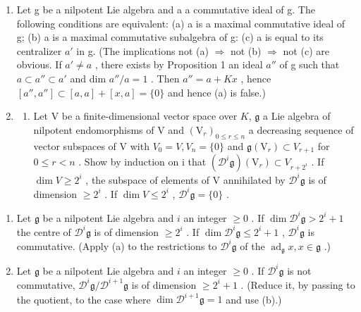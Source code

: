 \begin{enumerate}
\def\labelenumi{\arabic{enumi}.}
\setcounter{enumi}{5}
\item
  Let g be a nilpotent Lie algebra and a a commutative ideal of g. The following conditions are equivalent: (a) a is a maximal commutative ideal of g; (b) a is a maximal commutative subalgebra of g: (c) a is equal to its centralizer \(a'\) in g. (The implications not (a) \(\Rightarrow\) not (b) \(\Rightarrow\) not (c) are obvious. If \(a' \neq a\) , there exists by Proposition 1 an ideal \(a''\) of g such that \(a \subset a'' \subset a'\) and dim \(a''/a = 1\) . Then \(a'' = a + Kx\) , hence \([a'', a''] \subset [a, a] + [x, a] = \{0\}\) and hence (a) is false.)
\item
  \begin{enumerate}
  \def\labelenumii{(\alph{enumii})}
  \tightlist
  \item
    Let V be a finite-dimensional vector space over \(K\), \(\mathfrak{g}\) a Lie algebra of nilpotent endomorphisms of V and \((\mathrm{V}_{r})_{0 \leq r \leq n}\) a decreasing sequence of vector subspaces of V with \(V_{0} = V, V_{n} = \{0\}\) and \(\mathfrak{g}(\mathrm{V}_{r}) \subset V_{r+1}\) for \(0 \leq r < n\) . Show by induction on i that \((\mathcal{D}^{i}\mathfrak{g})(\mathrm{V}_{r}) \subset V_{r+2^{i}}\) . If \(\dim V \geq 2^{i}\) , the subspace of elements of V annihilated by \(\mathcal{D}^{i}\mathfrak{g}\) is of dimension \(\geqslant 2^{i}\) . If \(\dim V \leqslant 2^{i}\) , \(\mathcal{D}^{i}\mathfrak{g} = \{0\}\) .
  \end{enumerate}
\end{enumerate}

\begin{enumerate}
\def\labelenumi{(\alph{enumi})}
\setcounter{enumi}{1}
\item
  Let \(\mathfrak{g}\) be a nilpotent Lie algebra and \(i\) an integer \(\geqslant 0\) . If \(\dim \mathcal{D}^{i}\mathfrak{g} > 2^{i} + 1\) the centre of \(\mathcal{D}^{i}\mathfrak{g}\) is of dimension \(\geqslant 2^{i}\) . If \(\dim \mathcal{D}^{i}\mathfrak{g} \leqslant 2^{i} + 1\) , \(\mathcal{D}^{i}\mathfrak{g}\) is commutative. (Apply (a) to the restrictions to \(\mathcal{D}^{i}\mathfrak{g}\) of the \(\operatorname{ad}_{\mathfrak{g}} x, x \in \mathfrak{g}\) .)
\item
  Let \(\mathfrak{g}\) be a nilpotent Lie algebra and \(i\) an integer \(\geqslant 0\) . If \(\mathcal{D}^{i}\mathfrak{g}\) is not commutative, \(\mathcal{D}^{i}\mathfrak{g}/\mathcal{D}^{i+1}\mathfrak{g}\) is of dimension \(\geqslant 2^{i} + 1\) . (Reduce it, by passing to the quotient, to the case where \(\dim \mathcal{D}^{i+1}\mathfrak{g} = 1\) and use (b).)
\end{enumerate}

